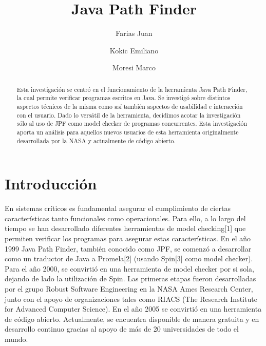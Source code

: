 \documentclass[runningheads]{llncs}
\begin{document}
%
\title{\textbf{Java Path Finder}
}
%

\author{Farias Juan\and
Kokic Emiliano \and
Moresi Marco}
%
%
%

\maketitle              %
%
\begin{abstract}
Esta investigaci\'on se centr\'o en el funcionamiento de la herramienta Java Path Finder, la cual permite verificar programas escritos en Java. Se investig\'o sobre distintos aspectos t\'ecnicos de la misma como as\'i tambi\'en aspectos de usabilidad e interacci\'on con el usuario.
Dado lo vers\'atil de la herramienta, decidimos acotar la investigaci\'on s\'olo al uso de JPF como model checker de programas concurrentes. Esta investigaci\'on aporta un an\'alisis para aquellos nuevos usuarios de esta herramienta originalmente desarrollada por la NASA y actualmente de c\'odigo abierto.


\end{abstract}
%
%
%
\section{Introducci\'on}

En sistemas cr\'iticos es fundamental asegurar el cumplimiento de ciertas caracter\'isticas tanto funcionales como operacionales. Para ello, a lo largo del tiempo se han desarrollado diferentes herramientas de model checking[1] que permiten verificar los programas para asegurar estas características. En el a\~no  1999 Java Path Finder, tambi\'en conocido como JPF,  se comenz\'o a desarrollar como un traductor de Java a Promela[2] (usando Spin[3] como model checker). Para el a\~no 2000, se convirti\'o en una herramienta de model checker por si sola, dejando de lado la utilizaci\'on de Spin. Las primeras etapas fueron desarrolladas por el grupo Robust Software Engineering en la NASA Ames Research Center, junto con el apoyo de organizaciones tales como RIACS (The Research Institute for Advanced Computer Science).
En el a\~no 2005 se convirti\'o en una herramienta de c\'odigo abierto. Actualmente, se encuentra disponible de manera gratuita y en desarrollo continuo gracias al apoyo de m\'as de 20 universidades de todo el mundo.
\end{document}
